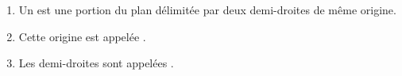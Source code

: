 \begin{enumerate}
    \item Un  est une portion du plan délimitée par deux demi-droites de même origine.
    \item Cette origine est appelée .
    \item Les demi-droites sont appelées .
\end{enumerate}